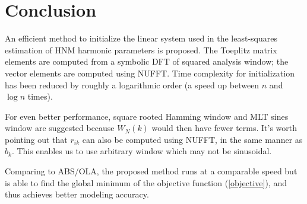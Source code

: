 \documentclass[dvips]{article}
\begin{document}
%
%
%
%
%

\section{Conclusion}

An efficient method to initialize the linear system used in the least-squares estimation of HNM harmonic parameters is proposed. The Toeplitz matrix elements are computed from a symbolic DFT of squared analysis window; the vector elements are computed using NUFFT. Time complexity for initialization has been reduced by roughly a logarithmic order (a speed up between $n$ and $\log n$ times).

For even better performance, square rooted Hamming window and MLT sines window\cite{smith} are suggested because $W_N(k)$ would then have fewer terms. It's worth pointing out that $r_{ik}$ can also be computed using NUFFT, in the same manner as $b_k$. This enables us to use arbitrary window which may not be sinusoidal.

Comparing to ABS/OLA\cite{george-1997}, the proposed method runs at a comparable speed but is able to find the global minimum of the objective function (\ref{objective}), and thus achieves better modeling accuracy.
\end{document}
